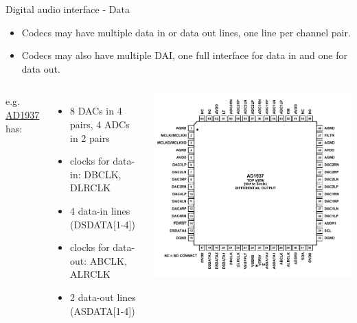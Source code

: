 \begin{frame}[fragile]{Digital audio interface - Data}
  \begin{itemize}
  \item Codecs may have multiple data in or data out lines, one line
    per channel pair.
  \item Codecs may also have multiple DAI, one full interface for data
    in and one for data out.
  \end{itemize}
  \begin{columns}
    e.g.
    \href{https://www.analog.com/media/en/technical-documentation/data-sheets/AD1937.pdf}
    {AD1937} has:
    \begin{itemize}
    \item 8 DACs in 4 pairs, 4 ADCs in 2 pairs
    \item clocks for data-in: DBCLK, DLRCLK
    \item 4 data-in lines (DSDATA[1-4])
    \item clocks for data-out: ABCLK, ALRCLK
    \item 2 data-out lines (ASDATA[1-4])
    \end{itemize}
    \includegraphics[width=\textwidth]{slides/audio-hardware/ad1937.pdf}\\
  \end{columns}
\end{frame}


